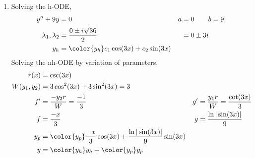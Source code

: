 \begin{enumerate}
    \item Solving the h-ODE,
          \begin{align}
              y'' + 9y                 & = 0                          &
              a                        & = 0 \qquad b = 9               \\
              \lambda_{1}, \lambda_{2} & = \frac{0 \pm i\sqrt{36}}{2} &
                                       & = 0 \pm 3i                     \\
              y_{h}                    & = {\color{y_h} c_{1}\cos(3x)
              + c_{2}\sin(3x)}
          \end{align}
          Solving the nh-ODE by variation of parameters,
          \begin{align}
              r(x)            & = \csc(3x)                                    \\
              W(y_{1}, y_{2}) & = 3\cos^{2}(3x) + 3\sin^{2}(3x) = 3           \\
              f'              & = \frac{-y_{2}r}{W} = \frac{-1}{3}          &
              g'              & = \frac{y_{1}r}{W} = \frac{\cot(3x)}{3}       \\
              f               & = \frac{-x}{3}                              &
              g               & = \frac{\ln|\sin(3x)|}{9}                     \\
              y_{p}           & = {\color{y_p} \frac{-x}{3} \cos(3x)
              + \frac{\ln|\sin(3x)|}{9}\sin(3x)}                              \\
              y               & = {\color{y_h} y_{h}} + {\color{y_p} y_{p}}
          \end{align}


\end{enumerate}
